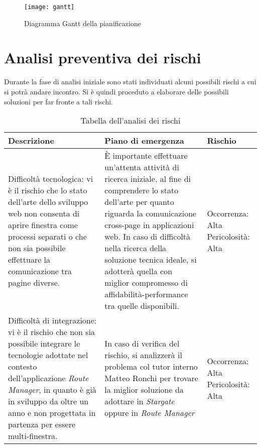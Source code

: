 \begin{figure}[!h] 
    \centering 
    \texttt{[image: gantt]} 
    \caption{Diagramma Gantt della pianificazione}
\end{figure}

\section{Analisi preventiva dei rischi}

Durante la fase di analisi iniziale sono stati individuati alcuni possibili rischi a cui si potrà andare incontro.
Si è quindi proceduto a elaborare delle possibili soluzioni per far fronte a tali rischi.\\

\begin{table}[H]
\begin{tabular}{ |p{6cm} |p{6cm} |p{3cm}|}
\hline
\textbf{Descrizione} & \textbf{Piano di emergenza} & \textbf{Rischio} \\ \hline
Difficoltà tecnologica: vi è il rischio che lo stato dell'arte dello sviluppo web non consenta di aprire finestra come processi separati o che non sia possibile effettuare la comunicazione tra pagine diverse. & È importante effettuare un'attenta attività di ricerca iniziale, al fine di comprendere lo stato dell'arte per quanto riguarda la comunicazione cross-page in applicazioni web. \newline In caso di difficoltà nella ricerca della soluzione tecnica ideale, si adotterà quella con miglior compromesso di affidabilità-performance tra quelle disponibili. & Occorrenza: Alta \newline Pericolosità: Alta \\ \hline

Difficoltà di integrazione: vi è il rischio che non sia possibile integrare le tecnologie adottate nel contesto dell'applicazione \textit{Route Manager}, in quanto è già in sviluppo da oltre un anno e non progettata in partenza per essere multi-finestra. & In caso di verifica del rischio, si analizzerà il problema col tutor interno Matteo Ronchi per trovare la miglior soluzione da adottare in \textit{Stargate} oppure in \textit{Route Manager} & Occorrenza: Alta \newline Pericolosità: Alta \\ \hline
\end{tabular}
\caption{Tabella dell'analisi dei rischi}
\end{table}

